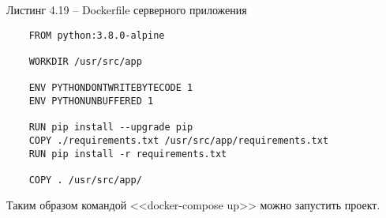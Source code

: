 Листинг 4.19 – Dockerfile серверного приложения
\begin{lstlisting}
    FROM python:3.8.0-alpine

    WORKDIR /usr/src/app

    ENV PYTHONDONTWRITEBYTECODE 1
    ENV PYTHONUNBUFFERED 1

    RUN pip install --upgrade pip
    COPY ./requirements.txt /usr/src/app/requirements.txt
    RUN pip install -r requirements.txt

    COPY . /usr/src/app/

\end{lstlisting}

Таким образом командой <<docker-compose up>> можно запустить проект.
